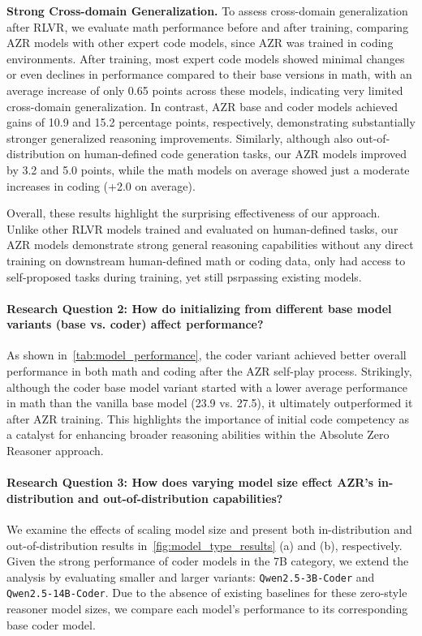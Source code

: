 \documentclass{article}
\begin{document}
\textbf{Strong Cross-domain Generalization.} To assess cross-domain generalization after RLVR, we evaluate math performance before and after training, comparing AZR models with other expert code models, since AZR was trained in coding environments. After training, most expert code models showed minimal changes or even declines in performance compared to their base versions in math, with an average increase of only 0.65 points across these models, indicating very limited cross-domain generalization. In contrast, AZR base and coder models achieved gains of 10.9 and 15.2 percentage points, respectively, demonstrating substantially stronger generalized reasoning improvements. Similarly, although also out-of-distribution on human-defined code generation tasks, our AZR models improved by 3.2 and 5.0 points, while the math models on average showed just a moderate increases in coding (+2.0 on average).

Overall, these results highlight the surprising effectiveness of our approach. Unlike other RLVR models trained and evaluated on human-defined tasks, our AZR models demonstrate strong general reasoning capabilities without any direct training on downstream human-defined math or coding data, only had access to self-proposed tasks during training, yet still psrpassing existing models.

\paragraph{Research Question 2: How do initializing from different base model variants (base vs. coder) affect performance?}
As shown in~\cref{tab:model_performance}, the coder variant achieved better overall performance in both math and coding after the AZR self-play process. Strikingly, although the coder base model variant started with a lower average performance in math than the vanilla base model (23.9 vs. 27.5), it ultimately outperformed it after AZR training. This highlights the importance of initial code competency as a catalyst for enhancing broader reasoning abilities within the Absolute Zero Reasoner approach.

\paragraph{Research Question 3: How does varying model size effect AZR's in-distribution and out-of-distribution capabilities?}
We examine the effects of scaling model size and present both in-distribution and out-of-distribution results in~\cref{fig:model_type_results} (a) and (b), respectively. Given the strong performance of coder models in the 7B category, we extend the analysis by evaluating smaller and larger variants: \texttt{Qwen2.5-3B-Coder} and \texttt{Qwen2.5-14B-Coder}. Due to the absence of existing baselines for these zero-style reasoner model sizes, we compare each model's performance to its corresponding base coder model.
\end{document}
